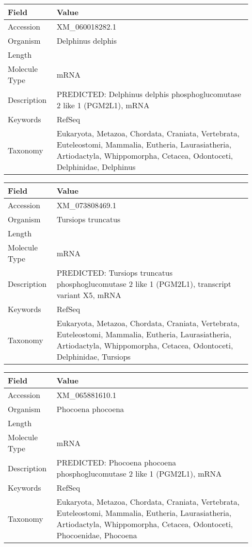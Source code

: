 \documentclass[10pt]{article}
\begin{document}
{\footnotesize
\begin{longtable}{>{\raggedright\arraybackslash}p{4.5cm} >{\raggedright\arraybackslash}p{11.5cm}}
\textbf{Field} & \textbf{Value} \\
\hline
Accession & XM\_060018282.1 \\
Organism & Delphinus delphis \\
Length & 4384 \\
Molecule Type & mRNA \\
Description & PREDICTED: Delphinus delphis phosphoglucomutase 2 like 1 (PGM2L1), mRNA \\
Keywords & RefSeq \\
Taxonomy & Eukaryota, Metazoa, Chordata, Craniata, Vertebrata, Euteleostomi, Mammalia, Eutheria, Laurasiatheria, Artiodactyla, Whippomorpha, Cetacea, Odontoceti, Delphinidae, Delphinus \\
\end{longtable}
}

{\footnotesize
\begin{longtable}{>{\raggedright\arraybackslash}p{4.5cm} >{\raggedright\arraybackslash}p{11.5cm}}
\textbf{Field} & \textbf{Value} \\
\hline
Accession & XM\_073808469.1 \\
Organism & Tursiops truncatus \\
Length & 3082 \\
Molecule Type & mRNA \\
Description & PREDICTED: Tursiops truncatus phosphoglucomutase 2 like 1 (PGM2L1), transcript variant X5, mRNA \\
Keywords & RefSeq \\
Taxonomy & Eukaryota, Metazoa, Chordata, Craniata, Vertebrata, Euteleostomi, Mammalia, Eutheria, Laurasiatheria, Artiodactyla, Whippomorpha, Cetacea, Odontoceti, Delphinidae, Tursiops \\
\end{longtable}
}

{\footnotesize
\begin{longtable}{>{\raggedright\arraybackslash}p{4.5cm} >{\raggedright\arraybackslash}p{11.5cm}}
\textbf{Field} & \textbf{Value} \\
\hline
Accession & XM\_065881610.1 \\
Organism & Phocoena phocoena \\
Length & 2763 \\
Molecule Type & mRNA \\
Description & PREDICTED: Phocoena phocoena phosphoglucomutase 2 like 1 (PGM2L1), mRNA \\
Keywords & RefSeq \\
Taxonomy & Eukaryota, Metazoa, Chordata, Craniata, Vertebrata, Euteleostomi, Mammalia, Eutheria, Laurasiatheria, Artiodactyla, Whippomorpha, Cetacea, Odontoceti, Phocoenidae, Phocoena \\
\end{longtable}
}
\end{document}
